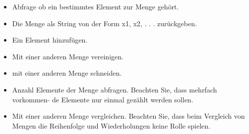 \begin{itemize}
	\item
		Abfrage ob ein bestimmtes Element zur Menge gehört.
	\item
		Die Menge als String von der Form {x1, x2, . . . } zurückgeben.
	\item
		Ein Element hinzufügen.
	\item
		Mit einer anderen Menge vereinigen.
	\item
		mit einer anderen Menge schneiden.
	\item
		Anzahl Elemente der Menge abfragen. Beachten Sie, dass mehrfach vorkommen- de Elemente nur einmal gezählt werden sollen.
	\item
		Mit einer anderen Menge vergleichen. Beachten Sie, dass beim Vergleich von Mengen die Reihenfolge und Wiederholungen keine Rolle spielen.
		
\end{itemize}

